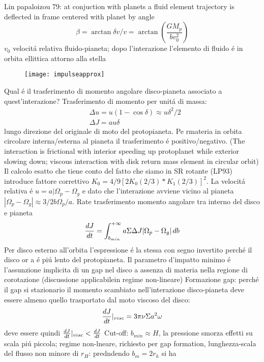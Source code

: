 \begin{workout}
\begin{workout}
Lin papaloizou 79: at conjuction with planets a fluid element trajectory is deflected in frame centered with planet by angle
\begin{equation}
\beta=\arctan{\delta v/v}=\arctan{(\frac{GM_p}{bv_0^2})}
\end{equation}
$v_0$ velocit\'a relativa fluido-pianeta; dopo l'interazione l'elemento di fluido \'e in orbita ellittica attorno alla stella
\begin{figure}[!t]
\texttt{[image: impulseapprox]}
\end{figure}
Qual \'e il trasferimento di momento angolare disco-pianeta associato a quest'interazione?
Trasferimento di momento per unit\'a di massa:
\begin{align}
&\Delta u=u(1-\cos{\delta})\approx u\delta^2/2\\
&\Delta J=au\delta
\end{align}
lungo direzione del originale di moto del protopianeta.
Pe rmateria in orbita circolare interna/esterna al pianeta il trasferimento \'e positivo/negativo.
(The interaction is frictional with interior speeding up protoplanet while exterior slowing down; viscous interaction with disk return mass element in circular orbit)
Il calcolo esatto che tiene conto del fatto che siamo in SR rotante (LP93) introduce fattore correttivo $K_0=4/9[2K_0(2/3)*K_1(2/3)]^2$.
La velocit\'a relativa \'e $u=a|\Omega_p-\Omega_g$ e dato che l'interazione avviene vicino al pianeta $|\Omega_p-\Omega_g|\approx3/2b\Omega_p/a$.
Rate trasferimento momento angolare tra interno del disco e pianeta
\begin{equation}
\TDy{t}{J}=\int_{b_{min}}^{+\infty}a\Sigma\Delta J|\Omega_p-\Omega_g|\,db
\end{equation}
Per disco esterno all'orbita l'espressione \'e la stessa con segno invertito perch\'e il disco or a \'e pi\'u lento del protopianeta.
Il parametro d'impatto minimo \'e l'assunzione implicita di un gap nel disco a assenza di materia nella regione di corotazione (discussione applicabilein regime non-lineare)
Formazione gap: perch\'e il gap si stazionario il momento scambiato nell'interazione disco-pianeta deve essere almeno quello trasportato dal moto viscoso del disco:
\begin{equation}
\TDy{t}{J}|_{visc}=3\pi\nu\Sigma a^2\omega
\end{equation}
deve essere quindi $\TDy{t}{J}|_{visc}<\TDy{t}{J}$
Cut-off: $b_{min}\approx H$, la pressione smorza effetti su scala pi\'u piccola; regime non-lneare, richiesto per gap formation, lunghezza-scala del flusso non minore di $r_H$: predndendo $b_m=2r_h$ si ha

\end{workout}
\end{workout}
